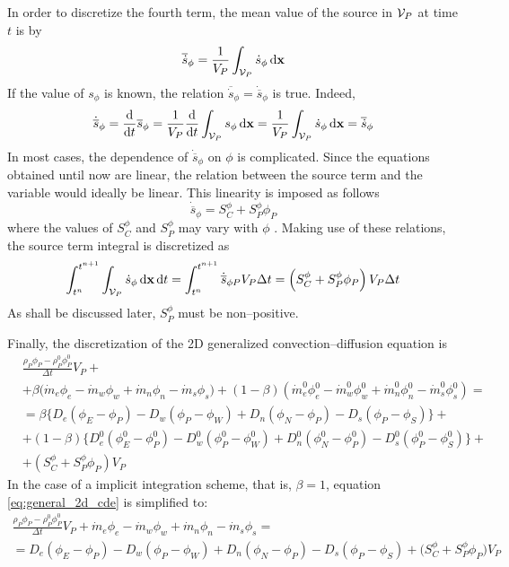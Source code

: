 In order to discretize the fourth term, the mean value of the source in $\mathcal{V}_{P}$ at time $t$ is by
\begin{equation}
	\overline{\dot{s}}_\phi = 
	\frac{1}{V_P} \int_{\mathcal{V}_{P}} \dot{s}_\phi \dd{\vb{x}}
\end{equation}
If the value of $s_\phi$ is known, the relation $\overline{\dot{s}}_\phi = \dot{\overline{s}}_\phi$ is true. Indeed,
\begin{equation}
	\dot{\overline{s}}_\phi = 
	\frac{\dd}{\dd{t}} \overline{s}_\phi = 
	\frac{1}{V_P} \frac{\dd}{\dd{t}} \int_{\mathcal{V}_{P}} s_\phi \dd{\vb{x}} = 
	\frac{1}{V_P} \int_{\mathcal{V}_{P}} \dot{s}_\phi \dd{\vb{x}} = 
	\overline{\dot{s}}_\phi
\end{equation}
In most cases, the dependence of $\dot{\overline{s}}_\phi$ on $\phi$ is complicated. Since the equations obtained until now are linear, the relation between the source term and the variable would ideally be linear. This linearity is imposed as follows
\begin{equation}
	\dot{\overline{s}}_\phi = S_C^\phi + S_P^\phi \phi_P
\end{equation}
where the values of $S_C^\phi$ and $S_P^\phi$ may vary with $\phi$ \cite{patankar2008numerical}. Making use of these relations, the source term integral is discretized as
\begin{equation}
	\int_{t^n}^{t^{n+1}} \int_{\mathcal{V}_{P}} \dot{s}_\phi \dd{\vb{x}} \dd{t} = 
	\int_{t^n}^{t^{n+1}} 
	\dot{\overline{s}}_{\phi P} V_P \Delta t = 
	\left( S_C^\phi + S_P^\phi \phi_P \right) V_P \Delta t
\end{equation}
As shall be discussed later, $S_P^\phi$ must be non--positive.

Finally, the discretization of the 2D generalized convection--diffusion equation is
\begin{align}
	&\frac{\rho_P \phi_P - \rho_P^0 \phi_P^0}{\Delta t} V_P + \nonumber \\
	&+ 
	\beta 
	\Big( \dot{m}_e \phi_e - \dot{m}_w \phi_w + \dot{m}_n \phi_n - \dot{m}_s \phi_s \Big) + 
	(1 - \beta) 
	\left( \dot{m}_e^0 \phi_e^0 - \dot{m}_w^0 \phi_w^0 + \dot{m}_n^0 \phi_n^0 - \dot{m}_s^0 \phi_s^0 \right) =  \nonumber \\
	&= 
	\beta 
	\Big\{ 
	D_e (\phi_E - \phi_P) - D_w (\phi_P - \phi_W) + D_n (\phi_N - \phi_P) - D_s (\phi_P - \phi_S) 
	\Big\} + \nonumber \\
	&+ (1 - \beta)
	\Big\{ 
	D_e^0 (\phi_E^0 - \phi_P^0) - D_w^0 (\phi_P^0 - \phi_W^0) + 
	D_n^0 (\phi_N^0 - \phi_P^0) - D_s^0 (\phi_P^0 - \phi_S^0)
	\Big\} + \nonumber \\
	&+ \left( S_C^\phi + S_P^\phi \phi_P \right) V_P \label{eq:general_2d_cde}
\end{align}
In the case of a implicit integration scheme, that is, $\beta = 1$, equation \eqref{eq:general_2d_cde} is simplified to:
\begin{multline}
	\frac{\rho_P \phi_P - \rho_P^0 \phi_P^0}{\Delta t} V_P + 
	\dot{m}_e \phi_e - \dot{m}_w \phi_w + \dot{m}_n \phi_n - \dot{m}_s \phi_s = \\ = 
	D_e (\phi_E - \phi_P) - D_w (\phi_P - \phi_W) + D_n (\phi_N - \phi_P) - D_s (\phi_P - \phi_S) +
	\big( S_C^\phi + S_P^\phi \phi_P \big) V_P
\end{multline}

